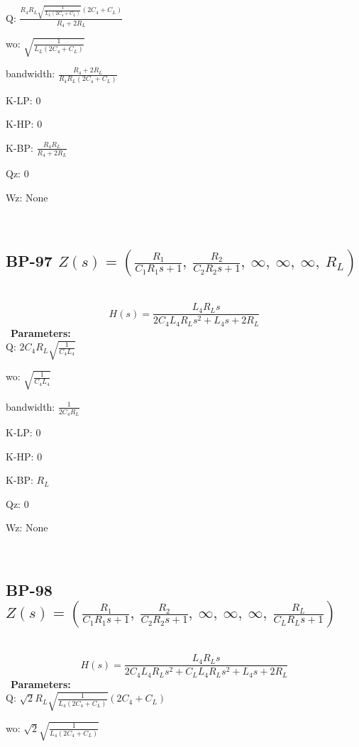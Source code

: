\documentclass{article}
\begin{document}
Q: $\frac{R_{4} R_{L} \sqrt{\frac{1}{L_{L} \left(2 C_{4} + C_{L}\right)}} \left(2 C_{4} + C_{L}\right)}{R_{4} + 2 R_{L}}$\ 

wo: $\sqrt{\frac{1}{L_{L} \left(2 C_{4} + C_{L}\right)}}$\ 

bandwidth: $\frac{R_{4} + 2 R_{L}}{R_{4} R_{L} \left(2 C_{4} + C_{L}\right)}$\ 

K-LP: $0$\ 

K-HP: $0$\ 

K-BP: $\frac{R_{4} R_{L}}{R_{4} + 2 R_{L}}$\ 

Qz: $0$\ 

Wz: $\text{None}$\ 

\ 

\subsection{BP-97 $Z(s) = \left( \frac{R_{1}}{C_{1} R_{1} s + 1}, \  \frac{R_{2}}{C_{2} R_{2} s + 1}, \  \infty, \  \infty, \  \infty, \  R_{L}\right)$ } \ 
\textbf{\[H(s) = \frac{L_{4} R_{L} s}{2 C_{4} L_{4} R_{L} s^{2} + L_{4} s + 2 R_{L}}\] } \ 
\textbf{Parameters:}\\ 

Q: $2 C_{4} R_{L} \sqrt{\frac{1}{C_{4} L_{4}}}$\ 

wo: $\sqrt{\frac{1}{C_{4} L_{4}}}$\ 

bandwidth: $\frac{1}{2 C_{4} R_{L}}$\ 

K-LP: $0$\ 

K-HP: $0$\ 

K-BP: $R_{L}$\ 

Qz: $0$\ 

Wz: $\text{None}$\ 

\ 

\subsection{BP-98 $Z(s) = \left( \frac{R_{1}}{C_{1} R_{1} s + 1}, \  \frac{R_{2}}{C_{2} R_{2} s + 1}, \  \infty, \  \infty, \  \infty, \  \frac{R_{L}}{C_{L} R_{L} s + 1}\right)$ } \ 
\textbf{\[H(s) = \frac{L_{4} R_{L} s}{2 C_{4} L_{4} R_{L} s^{2} + C_{L} L_{4} R_{L} s^{2} + L_{4} s + 2 R_{L}}\] } \ 
\textbf{Parameters:}\\ 

Q: $\sqrt{2} R_{L} \sqrt{\frac{1}{L_{4} \left(2 C_{4} + C_{L}\right)}} \left(2 C_{4} + C_{L}\right)$\ 

wo: $\sqrt{2} \sqrt{\frac{1}{L_{4} \left(2 C_{4} + C_{L}\right)}}$\ 
\end{document}
